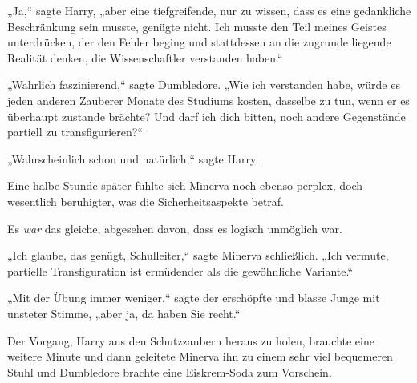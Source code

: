 „Ja,“ sagte Harry, „aber eine tiefgreifende, nur zu wissen, dass es eine gedankliche Beschränkung sein musste, genügte nicht. Ich musste den Teil meines Geistes unterdrücken, der den Fehler beging und stattdessen an die zugrunde liegende Realität denken, die Wissenschaftler verstanden haben.“

„Wahrlich faszinierend,“ sagte Dumbledore. „Wie ich verstanden habe, würde es jeden anderen Zauberer Monate des Studiums kosten, dasselbe zu tun, wenn er es überhaupt zustande brächte? Und darf ich dich bitten, noch andere Gegenstände partiell zu transfigurieren?“

„Wahrscheinlich schon und natürlich,“ sagte Harry.

Eine halbe Stunde später fühlte sich Minerva noch ebenso perplex, doch wesentlich beruhigter, was die Sicherheitsaspekte betraf.

Es \emph{war} das gleiche, abgesehen davon, dass es logisch unmöglich war.

„Ich glaube, das genügt, Schulleiter,“ sagte Minerva schließlich. „Ich vermute, partielle Transfiguration ist ermüdender als die gewöhnliche Variante.“

„Mit der Übung immer weniger,“ sagte der erschöpfte und blasse Junge mit unsteter Stimme, „aber ja, da haben Sie recht.“

Der Vorgang, Harry aus den Schutzzaubern heraus zu holen, brauchte eine weitere Minute und dann geleitete Minerva ihn zu einem sehr viel bequemeren Stuhl und Dumbledore brachte eine Eiskrem-Soda zum Vorschein.

